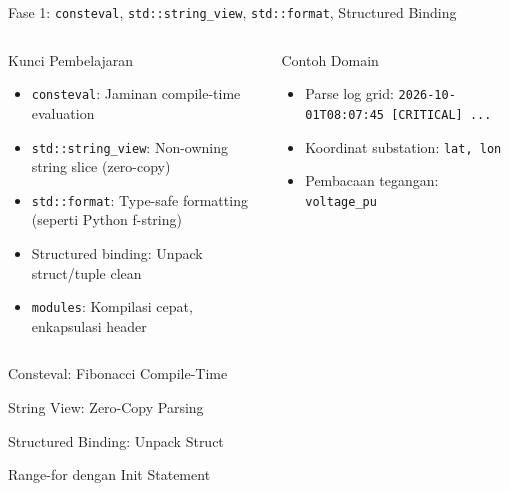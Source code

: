 \documentclass[aspectratio=169,10pt]{beamer}
\newcommand{\consteval}{\texttt{consteval}}
\newcommand{\stringview}{\texttt{std::string\_view}}
\newcommand{\format}{\texttt{std::format}}
\newcommand{\modules}{\texttt{modules}}
\begin{document}
\begin{frame}{Fase 1: \consteval, \stringview, \format, Structured Binding}
  \begin{columns}[T]
    \begin{block}{Kunci Pembelajaran}
      \begin{itemize}
        \item \consteval: Jaminan compile-time evaluation
        \item \stringview: Non-owning string slice (zero-copy)
        \item \format: Type-safe formatting (seperti Python f-string)
        \item Structured binding: Unpack struct/tuple clean
        \item \modules: Kompilasi cepat, enkapsulasi header
      \end{itemize}
    \end{block}
    
    \begin{exampleblock}{Contoh Domain}
      \begin{itemize}
        \item Parse log grid: \texttt{2026-10-01T08:07:45 [CRITICAL] ...}
        \item Koordinat substation: \texttt{lat, lon}
        \item Pembacaan tegangan: \texttt{voltage\_pu}
      \end{itemize}
    \end{exampleblock}
  \end{columns}
\end{frame}

\begin{frame}[fragile]{Consteval: Fibonacci Compile-Time}
  
\end{frame}

\begin{frame}[fragile]{String View: Zero-Copy Parsing}
  
  \vspace{0.3cm}
  
\end{frame}

\begin{frame}[fragile]{Structured Binding: Unpack Struct}
  
\end{frame}

\begin{frame}[fragile]{Range-for dengan Init Statement}
  
\end{frame}
\end{document}

